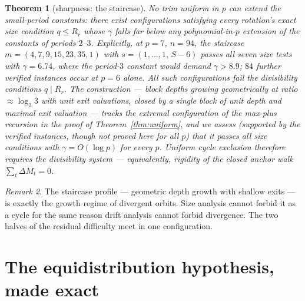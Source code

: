 \documentclass[11pt]{article}
\newtheorem{theorem}{Theorem}[section]
\theoremstyle{remark}
\newtheorem{remark}[theorem]{Remark}
\newcommand{\LL}{\log_2 3}
\begin{document}
\begin{theorem}[sharpness: the staircase]\label{thm:staircase}
No trim uniform in $p$ can extend the small-period constants: there exist configurations satisfying every rotation's exact size condition $q \le R_r$ whose $\gamma$ falls far below any polynomial-in-$p$ extension of the constants of periods $2$--$3$. Explicitly, at $p=7$, $n=94$, the staircase $m = (4,7,9,15,23,35,1)$ with $s = (1,\dots,1,\,S-6)$ passes all seven size tests with $\gamma = 6.74$, where the period-$3$ constant would demand $\gamma > 8.9$; $84$ further verified instances occur at $p=6$ alone. All such configurations fail the divisibility conditions $q \mid R_r$. The construction --- block depths growing geometrically at ratio $\approx\LL$ with unit exit valuations, closed by a single block of unit depth and maximal exit valuation --- tracks the extremal configuration of the max-plus recursion in the proof of Theorem~\ref{thm:uniform}, and we assess (supported by the verified instances, though not proved here for all $p$) that it passes all size conditions with $\gamma = O(\log p)$ for every $p$. Uniform cycle exclusion therefore requires the divisibility system --- equivalently, rigidity of the closed anchor walk $\sum_t \Delta M_t = 0$.
\end{theorem}

\begin{remark}\label{rem:staircase}
The staircase profile --- geometric depth growth with shallow exits --- is exactly the growth regime of divergent orbits. Size analysis cannot forbid it as a cycle for the same reason drift analysis cannot forbid divergence. The two halves of the residual difficulty meet in one configuration.
\end{remark}

\section{The equidistribution hypothesis, made exact}\label{sec:aeh}
\end{document}
